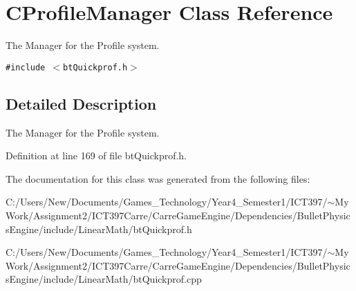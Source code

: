 \hypertarget{class_c_profile_manager}{
\section{CProfileManager Class Reference}
\label{class_c_profile_manager}
}
The Manager for the Profile system.  


{\tt \#include $<$btQuickprof.h$>$}



\subsection{Detailed Description}
The Manager for the Profile system. 

Definition at line 169 of file btQuickprof.h.

The documentation for this class was generated from the following files:\begin{CompactItemize}
\item 
C:/Users/New/Documents/Games\_\-Technology/Year4\_\-Semester1/ICT397/$\sim$My Work/Assignment2/ICT397Carre/CarreGameEngine/Dependencies/BulletPhysicsEngine/include/LinearMath/btQuickprof.h\item 
C:/Users/New/Documents/Games\_\-Technology/Year4\_\-Semester1/ICT397/$\sim$My Work/Assignment2/ICT397Carre/CarreGameEngine/Dependencies/BulletPhysicsEngine/include/LinearMath/btQuickprof.cpp\end{CompactItemize}
